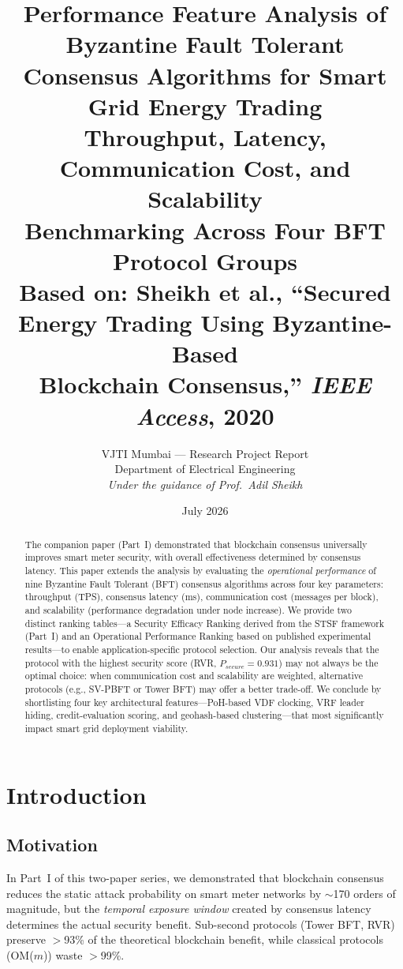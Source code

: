 \documentclass[10pt,twocolumn,letterpaper]{article}
\title{\textbf{Performance Feature Analysis of Byzantine Fault Tolerant\\Consensus Algorithms for Smart Grid Energy Trading}\\[8pt]
\large Throughput, Latency, Communication Cost, and Scalability\\Benchmarking Across Four BFT Protocol Groups\\[4pt]
\normalsize Based on: Sheikh et al., ``Secured Energy Trading Using Byzantine-Based\\Blockchain Consensus,'' \emph{IEEE Access}, 2020}
\author{%
VJTI Mumbai --- Research Project Report\\
Department of Electrical Engineering\\[4pt]
\small \emph{Under the guidance of Prof.\ Adil Sheikh}
}
\date{July 2026}
\begin{document}
\maketitle

\begin{abstract}
The companion paper (Part~I) demonstrated that blockchain consensus universally improves smart meter security, with overall effectiveness determined by consensus latency. This paper extends the analysis by evaluating the \emph{operational performance} of nine Byzantine Fault Tolerant (BFT) consensus algorithms across four key parameters: throughput (TPS), consensus latency (ms), communication cost (messages per block), and scalability (performance degradation under node increase). We provide two distinct ranking tables---a Security Efficacy Ranking derived from the STSF framework (Part~I) and an Operational Performance Ranking based on published experimental results---to enable application-specific protocol selection. Our analysis reveals that the protocol with the highest security score (RVR, $P_{secure} = 0.931$) may not always be the optimal choice: when communication cost and scalability are weighted, alternative protocols (e.g., SV-PBFT or Tower BFT) may offer a better trade-off. We conclude by shortlisting four key architectural features---PoH-based VDF clocking, VRF leader hiding, credit-evaluation scoring, and geohash-based clustering---that most significantly impact smart grid deployment viability.
\end{abstract}

\section{Introduction}
\label{sec:introduction}

\subsection{Motivation}

In Part~I of this two-paper series, we demonstrated that blockchain consensus reduces the static attack probability on smart meter networks by $\sim$170 orders of magnitude, but the \emph{temporal exposure window} created by consensus latency determines the actual security benefit. Sub-second protocols (Tower BFT, RVR) preserve $>$93\% of the theoretical blockchain benefit, while classical protocols (OM($m$)) waste $>$99\%.
\end{document}
